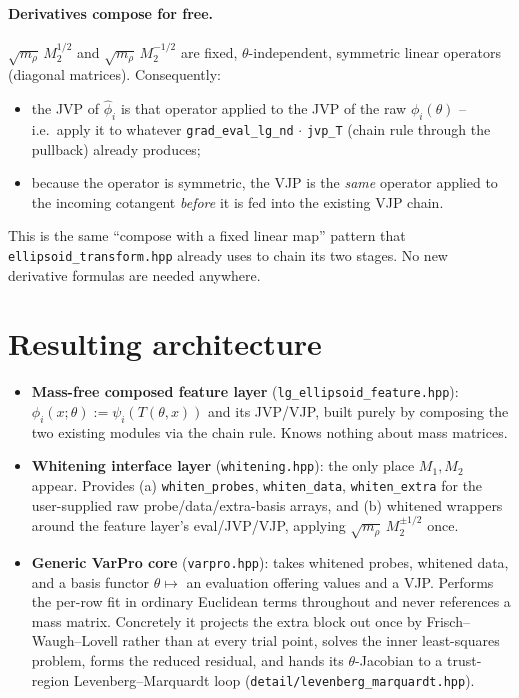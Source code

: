 \documentclass[11pt]{article}
\newcommand{\Mone}{M_1}
\newcommand{\Mtwo}{M_2}
\newcommand{\what}[1]{\widehat{#1}}
\begin{document}
\paragraph{Derivatives compose for free.} $\sqrt{m_\rho}\,\Mtwo^{1/2}$ and
$\sqrt{m_\rho}\,\Mtwo^{-1/2}$ are fixed, $\theta$-independent, symmetric
linear operators (diagonal matrices). Consequently:
\begin{itemize}
\item the JVP of $\what\phi_i$ is that operator applied to the JVP of the
  raw $\phi_i(\theta)$ -- i.e.\ apply it to whatever
  \texttt{grad\_eval\_lg\_nd} $\cdot$ \texttt{jvp\_T} (chain rule through
  the pullback) already produces;
\item because the operator is symmetric, the VJP is the \emph{same}
  operator applied to the incoming cotangent \emph{before} it is fed into
  the existing VJP chain.
\end{itemize}
This is the same ``compose with a fixed linear map'' pattern that
\texttt{ellipsoid\_transform.hpp} already uses to chain its two stages. No new
derivative formulas are needed anywhere.

\section{Resulting architecture}

\begin{itemize}
\item \textbf{Mass-free composed feature layer} (\texttt{lg\_ellipsoid\_feature.hpp}):
  $\phi_i(x;\theta) := \psi_i(T(\theta,x))$ and its JVP/VJP, built purely by
  composing the two existing modules via the chain rule. Knows nothing
  about mass matrices.
\item \textbf{Whitening interface layer} (\texttt{whitening.hpp}): the only
  place $\Mone,\Mtwo$ appear. Provides (a) \texttt{whiten\_probes},
  \texttt{whiten\_data}, \texttt{whiten\_extra} for the user-supplied raw
  probe/data/extra-basis arrays, and (b) whitened wrappers around the
  feature layer's eval/JVP/VJP, applying
  $\sqrt{m_\rho}\,\Mtwo^{\pm 1/2}$ once.
\item \textbf{Generic VarPro core} (\texttt{varpro.hpp}): takes whitened
  probes, whitened data, and a basis functor $\theta \mapsto$ an evaluation
  offering values and a VJP. Performs the per-row fit in ordinary Euclidean
  terms throughout and never references a mass matrix. Concretely it projects
  the extra block out once by Frisch--Waugh--Lovell rather than at every trial
  point, solves the inner least-squares problem, forms the reduced residual,
  and hands its $\theta$-Jacobian to a trust-region Levenberg--Marquardt loop
  (\texttt{detail/levenberg\_marquardt.hpp}).
\end{itemize}
\end{document}
